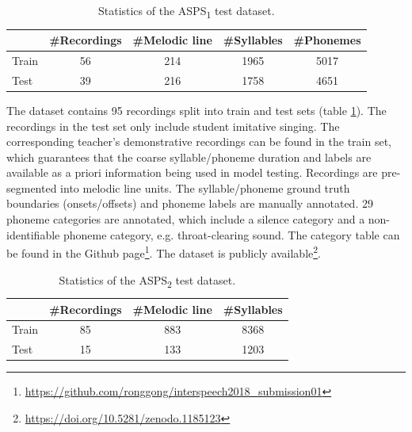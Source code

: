 \begin{table}[ht]
    \centering
    \caption{Statistics of the ASPS\textsubscript{1} test dataset.}
    \label{table:ch4:detailInfoDataset_asps_1}
    \begin{tabular}{l|cccc}
        \toprule
        & \#Recordings & \#Melodic line & \#Syllables & \#Phonemes \\
        \midrule
        Train           & 56 & 214 & 1965 & 5017 \\
        Test               & 39 & 216 & 1758 & 4651  \\
        \bottomrule
    \end{tabular}
\end{table}

The dataset contains 95 recordings split into train and test sets (table \ref{table:ch4:detailInfoDataset_asps_1}). The recordings in the test set only include student imitative singing. The corresponding teacher's demonstrative recordings can be found in the train set, which guarantees that the coarse syllable/phoneme duration and labels are available as a priori information being used in model testing. Recordings are pre-segmented into melodic line units. The syllable/phoneme ground truth boundaries (onsets/offsets) and phoneme labels are manually annotated. 29 phoneme categories are annotated, which include a silence category and a non-identifiable phoneme category, e.g. throat-clearing sound. The category table can be found in the Github page\footnote{\label{ft:github}\url{https://github.com/ronggong/interspeech2018_submission01}}. The dataset is publicly available\footnote{\url{https://doi.org/10.5281/zenodo.1185123}}.

\begin{table}[ht]
    \centering
    \caption{Statistics of the ASPS\textsubscript{2} test dataset.}
    \label{table:ch4:detail_info_jingju_dataset_asps_2}
    \begin{tabular}{l|ccc}
        \toprule
        & \#Recordings & \#Melodic line & \#Syllables \\
        \midrule
        Train           & 85 & 883 & 8368  \\
        Test               & 15 & 133 & 1203  \\
        \bottomrule
    \end{tabular}
\end{table}

